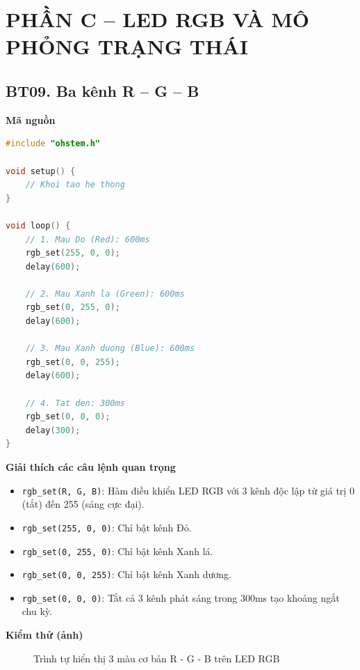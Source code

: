 \section*{PHẦN C – LED RGB VÀ MÔ PHỎNG TRẠNG THÁI}

\subsection*{BT09. Ba kênh R – G – B}

\noindent\textbf{Mã nguồn}\\
\begin{lstlisting}[language=C]
#include "ohstem.h"

void setup() {
    // Khoi tao he thong
}

void loop() {
    // 1. Mau Do (Red): 600ms
    rgb_set(255, 0, 0);
    delay(600);

    // 2. Mau Xanh la (Green): 600ms
    rgb_set(0, 255, 0);
    delay(600);

    // 3. Mau Xanh duong (Blue): 600ms
    rgb_set(0, 0, 255);
    delay(600);

    // 4. Tat den: 300ms
    rgb_set(0, 0, 0);
    delay(300);
}
\end{lstlisting}

\noindent\textbf{Giải thích các câu lệnh quan trọng}\\
\begin{itemize}
    \item \texttt{rgb\_set(R, G, B)}: Hàm điều khiển LED RGB với 3 kênh độc lập từ giá trị 0 (tắt) đến 255 (sáng cực đại).
    \item \texttt{rgb\_set(255, 0, 0)}: Chỉ bật kênh Đỏ.
    \item \texttt{rgb\_set(0, 255, 0)}: Chỉ bật kênh Xanh lá.
    \item \texttt{rgb\_set(0, 0, 255)}: Chỉ bật kênh Xanh dương.
    \item \texttt{rgb\_set(0, 0, 0)}: Tắt cả 3 kênh phát sáng trong 300ms tạo khoảng ngắt chu kỳ.
\end{itemize}

\noindent\textbf{Kiểm thử (ảnh)}\\
\begin{figure}[H]
    \centering
    \caption{Trình tự hiển thị 3 màu cơ bản R - G - B trên LED RGB}
    \label{fig:bt09}
\end{figure}

